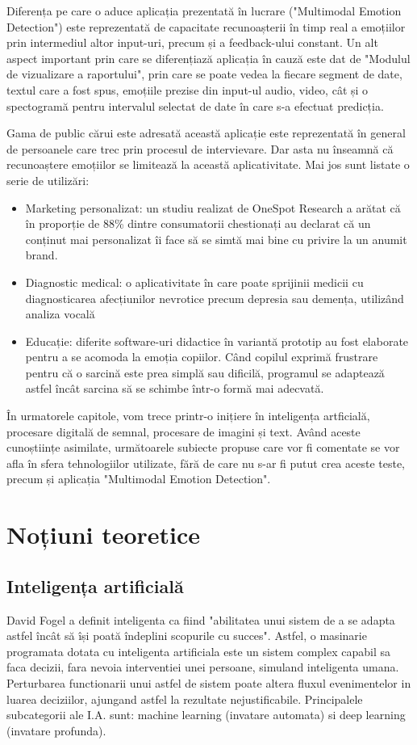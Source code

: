 \documentclass[a4paper, 12pt]{report}
\begin{document}
	Diferența pe care o aduce aplicația prezentată în lucrare ("Multimodal Emotion Detection") este reprezentată de capacitate recunoașterii în timp real a emoțiilor prin intermediul altor input-uri, precum și a feedback-ului constant. Un alt aspect important prin care se diferențiază aplicația în cauză este dat de "Modulul de vizualizare a raportului", prin care se poate vedea la fiecare segment de date, textul care a fost spus, emoțiile prezise din input-ul audio, video, cât și o spectogramă pentru intervalul selectat de date în care s-a efectuat predicția.
	
	Gama de public cărui este adresată această aplicație este reprezentată în general de persoanele care trec prin procesul de intervievare. Dar asta nu înseamnă că recunoaștere emoțiilor se limitează la această aplicativitate. Mai jos sunt listate o serie de utilizări:
	\begin{itemize}
		\item Marketing personalizat: un studiu realizat de OneSpot Research a arătat că în proporție de 88\% dintre consumatorii chestionați au declarat că un conținut mai personalizat îi face să se simtă mai bine cu privire la un anumit brand.
		\item Diagnostic medical: o aplicativitate în care poate sprijinii medicii cu diagnosticarea afecțiunilor nevrotice precum depresia sau demența, utilizând analiza vocală
		\item Educație: diferite software-uri didactice în variantă prototip au fost elaborate pentru a se acomoda la emoția copiilor. Când copilul exprimă frustrare pentru că o sarcină este prea simplă sau dificilă, programul se adaptează astfel încât sarcina să se schimbe într-o formă mai adecvată.
	\end{itemize}
	
	În urmatorele capitole, vom trece printr-o inițiere în inteligența artficială, procesare digitală de semnal, procesare de imagini și text. Având aceste cunoștiințe asimilate, următoarele subiecte propuse care vor fi comentate se vor afla în sfera tehnologiilor utilizate, fără de care nu s-ar fi putut crea aceste teste, precum și aplicația "Multimodal Emotion Detection". 
	\clearpage
	
	\section{Noțiuni teoretice}
	\subsection{Inteligența artificială}
	David Fogel a definit inteligenta ca fiind "abilitatea unui sistem de a se adapta astfel încât să își poată îndeplini scopurile cu succes". Astfel, o masinarie programata dotata cu inteligenta artificiala este un sistem complex capabil sa faca decizii, fara nevoia interventiei unei persoane, simuland inteligenta umana. Perturbarea functionarii unui astfel de sistem poate altera fluxul evenimentelor in luarea deciziilor, ajungand astfel la rezultate nejustificabile. Principalele subcategorii ale I.A. sunt: machine learning (invatare automata) si deep learning (invatare profunda).
		
\end{document}
